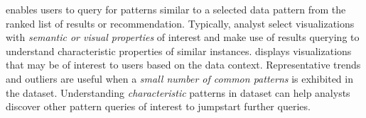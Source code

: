 {     enables users to query for patterns similar to a selected data pattern from the ranked list of results or recommendation. Typically, analyst select visualizations with \emph{semantic or visual properties} of interest and make use of results querying to understand characteristic properties of similar instances.
     displays visualizations that may be of interest to users based on the data context. Representative trends and outliers are useful when a \emph{small number of common patterns} is exhibited in the dataset. Understanding \emph{characteristic} patterns in dataset can help analysts discover other pattern queries of interest to jumpstart further queries.
}
